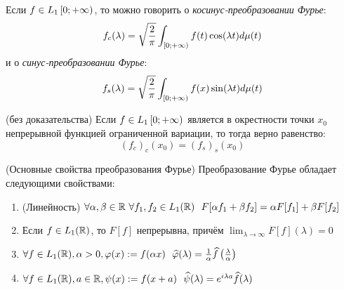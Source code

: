 \begin{definition}
	Если $f \in L_1\left[0; +\infty\right)$, то можно говорить о \textit{косинус-преобразовании Фурье}:
	\[
		f_c(\lambda) = \sqrt{\frac{2}{\pi}} \int_{\left[0; +\infty\right)} f(t)\cos(\lambda t)d\mu(t)
	\]
	и о \textit{синус-преобразовании Фурье}:
	\[
		f_s(\lambda) = \sqrt{\frac{2}{\pi}} \int_{\left[0; +\infty\right)} f(x)\sin(\lambda t)d\mu(t)
	\]
\end{definition}

\begin{proposition} (без доказательства)
	Если $f \in L_1\left[0; +\infty\right)$ является в окрестности точки $x_0$ непрерывной функцией ограниченной вариации, то тогда верно равенство:
	\[
		(f_c)_c(x_0) = (f_s)_s(x_0)
	\]
\end{proposition}

\begin{theorem} (Основные свойства преобразования Фурье)
	Преобразование Фурье обладает следующими свойствами:
	\begin{enumerate}
		\item (Линейность) $\forall \alpha, \beta \in \mathbb{R}\ \forall f_1, f_2 \in L_1(\mathbb{R})\ \ F[\alpha f_1 + \beta f_2] = \alpha F[f_1] + \beta F[f_2]$
		
		\item Если $f \in L_1(\mathbb{R})$, то $F[f]$ непрерывна, причём $\lim_{\lambda \to \infty} F[f](\lambda) = 0$
		
		\item $\forall f \in L_1(\mathbb{R}), \alpha > 0, \varphi(x) := f(\alpha x)\ \ \widehat{\varphi}(\lambda) = \frac{1}{\alpha}\widehat{f}\left(\frac{\lambda}{\alpha}\right)$
		
		\item $\forall f \in L_1(\mathbb{R}), a \in \mathbb{R}, \psi(x) := f(x + a)\ \ \widehat{\psi}(\lambda) = e^{i\lambda a}\widehat{f}(\lambda)$
	\end{enumerate}
\end{theorem}

